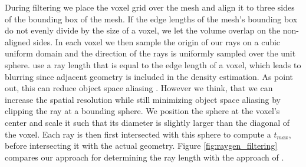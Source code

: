 During filtering we place the voxel grid over the mesh and align it to three sides of the bounding box of the mesh.
If the edge lengths of the mesh's bounding box do not evenly divide by the size of a voxel, we let the volume overlap on the non-aligned sides.
In each voxel we then sample the origin of our rays on a cubic uniform domain and the direction of the rays is uniformly sampled over the unit sphere.
\citeauthor{hybrid_mesh_volume_lods} use a ray length that is equal to the edge length of a voxel, which leads to blurring since adjacent geometry is included in the density estimation.
As \citeauthor{wang_object_space_aliasing} point out, this can reduce object space aliasing \cite{wang_object_space_aliasing}.
However we think, that we can increase the spatial resolution while still minimizing object space aliasing by clipping the ray at a bounding sphere.
We position the sphere at the voxel's center and scale it such that its diameter is slightly larger than the diagonal of the voxel.
Each ray is then first intersected with this sphere to compute a $t_{max}$, before intersecting it with the actual geometry.
Figure \ref{fig:raygen_filtering} compares our approach for determining the ray length with the approach of \citeauthor{hybrid_mesh_volume_lods} \cite{hybrid_mesh_volume_lods}.
